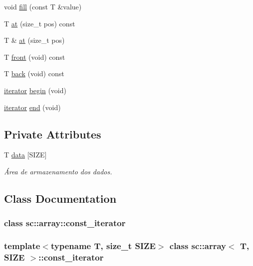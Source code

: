 \begin{DoxyCompactItemize}
void \hyperlink{classsc_1_1array_a7d551e257cf8b7f7fdcc92693ea06bf0}{fill} (const T \&value)
\item 
T \hyperlink{classsc_1_1array_aad40fb7df50600eb5be40fcb566b9087}{at} (size\+\_\+t pos) const
\item 
T \& \hyperlink{classsc_1_1array_aff94618867791f38760b766579a0668d}{at} (size\+\_\+t pos)
\item 
T \hyperlink{classsc_1_1array_a417d396dd4eb592ee3fc22ec347ef30b}{front} (void) const
\item 
T \hyperlink{classsc_1_1array_afb7bab6d5a69b9b2d47ab1dbf6b108e7}{back} (void) const
\item 
\hyperlink{classsc_1_1array_1_1iterator}{iterator} \hyperlink{classsc_1_1array_a3fd930db6e110a2e65784493d744fb8e}{begin} (void)
\item 
\hyperlink{classsc_1_1array_1_1iterator}{iterator} \hyperlink{classsc_1_1array_a9aa072f30e0000c8ed913207a1904bc9}{end} (void)
\end{DoxyCompactItemize}
\subsection*{Private Attributes}
\begin{DoxyCompactItemize}
\item 
T \hyperlink{classsc_1_1array_a84479dfe2681e2bfeeef261267bbb200}{data} \mbox{[}S\+I\+ZE\mbox{]}
\begin{DoxyCompactList}\small\item\em Área de armazenamento dos dados. \end{DoxyCompactList}\end{DoxyCompactItemize}


\subsection{Class Documentation}
\label{classsc_1_1array_1_1const__iterator}
\subsubsection{class sc\+:\+:array\+:\+:const\+\_\+iterator}
\subsubsection*{template$<$typename T, size\+\_\+t S\+I\+ZE$>$\newline
class sc\+::array$<$ T, S\+I\+Z\+E $>$\+::const\+\_\+iterator}



